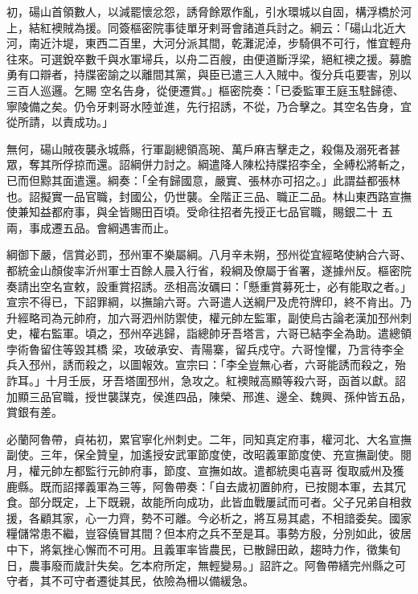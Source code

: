 \begin{pinyinscope}
 初，碭山首領數人，以減罷懷忿怨，誘脅餘眾作亂，引水環城以自固，構浮橋於河上，結紅襖賊為援。同簽樞密院事徒單牙剌哥會諸道兵討之。綱云：「碭山北近大河，南近汴堤，東西二百里，大河分派其間，乾灘泥淖，步騎俱不可行，惟宜輕舟往來。可選銳卒數千與水軍埽兵，以舟二百艘，由便道斷浮梁，絕紅襖之援。募膽勇有口辯者，持牒密諭之以離間其黨，與臣已遣三人入賊中。復分兵屯要害，別以三百人巡邏。乞賜
 空名告身，從便遷賞。」樞密院奏：「已委監軍王庭玉駐歸德、寧陵備之矣。仍令牙剌哥水陸並進，先行招誘，不從，乃合擊之。其空名告身，宜從所請，以責成功。」



 無何，碭山賊夜襲永城縣，行軍副總領高琬、萬戶麻吉擊走之，殺傷及溺死者甚眾，奪其所俘掠而還。詔綱併力討之。綱遣降人陳松持牒招李全，全縛松將斬之，已而但黥其面遣還。綱奏：「全有歸國意，嚴實、張林亦可招之。」此謂益都張林也。詔擬實一品官職，封國公，仍世襲。全階正三品、職正二品。林山東西路宣撫使兼知益都府事，與全皆賜田百頃。受命往招者先授正七品官職，賜銀二十
 五兩，事成遷五品。會綱遇害而止。



 綱御下嚴，信賞必罰，邳州軍不樂屬綱。八月辛未朔，邳州從宜經略使納合六哥、都統金山顏俊率沂州軍士百餘人晨入行省，殺綱及僚屬于省署，遂據州反。樞密院奏請出空名宣敕，設重賞招誘。丞相高汝礪曰：「懸重賞募死士，必有能取之者。」宣宗不得已，下詔罪綱，以撫諭六哥。六哥遣人送綱尸及虎符牌印，終不肯出。乃升經略司為元帥府，加六哥泗州防禦使，權元帥左監軍，副使烏古論老漢加邳州刺史，權右監軍。頃之，邳州卒逃歸，詣總帥牙吾塔言，六哥已結李全為助。遣總領孛術魯留住等毀其橋
 梁，攻破承安、青陽寨，留兵戍守。六哥惶懼，乃言待李全兵入邳州，誘而殺之，以圖報效。宣宗曰：「李全豈無心者，六哥能誘而殺之，殆詐耳。」十月壬辰，牙吾塔圍邳州，急攻之。紅襖賊高顯等殺六哥，函首以獻。詔加顯三品官職，授世襲謀克，侯進四品，陳榮、邢進、邊全、魏興、孫仲皆五品，賞銀有差。



 必蘭阿魯帶，貞祐初，累官寧化州刺史。二年，同知真定府事，權河北、大名宣撫副使。三年，保全贊皇，加遙授安武軍節度使，改昭義軍節度使、充宣撫副使。閱月，權元帥左都監行元帥府事，節度、宣撫如故。遣都統奧屯喜哥
 復取威州及獲鹿縣。既而詔擇義軍為三等，阿魯帶奏：「自去歲初置帥府，已按閱本軍，去其冗食。部分既定，上下既親，故能所向成功，此皆血戰屢試而可者。父子兄弟自相救援，各顧其家，心一力齊，勢不可離。今必析之，將互易其處，不相諳委矣。國家糧儲常患不繼，豈容僥冒其間？但本府之兵不至是耳。事勢方殷，分別如此，彼居中下，將氣挫心懈而不可用。且義軍率皆農民，已散歸田畝，趨時力作，徵集旬日，農事廢而歲計失矣。乞本府所定，無輕變易。」詔許之。阿魯帶繕完州縣之可守者，其不可守者遷徙其民，依險為柵以備緩急。




\end{pinyinscope}
